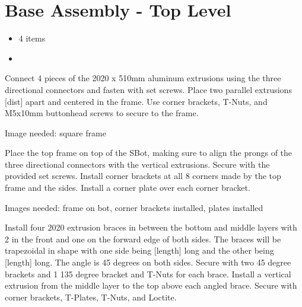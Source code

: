 \section{Base Assembly - Top Level}
\resetassemblysteps

\begin{partsbox}
\begin{minipage}[t]{\linewidth}
\vspace{0pt}
\begin{itemize}

\item
  4 items
\item
    
\end{itemize}
\end{minipage}
\end{partsbox}

Connect 4 pieces of the 2020 x 510mm aluminum extrusions using the three directional connectors and fasten with set screws. Place two parallel extrusions [dist] apart and centered in the frame. Use corner brackets, T-Nuts, and M5x10mm buttonhead screws to secure to the frame.

\begin{tipbox}
    Image needed: square frame
\end{tipbox}

Place the top frame on top of the SBot, making sure to align the prongs of the three directional connectors with the vertical extrusions. Secure with the provided set screws. Install corner brackets at all 8 corners made by the top frame and the sides. Install a corner plate over each corner bracket.

\begin{tipbox}
    Images needed: frame on bot, corner brackets installed, plates installed
\end{tipbox}

Install four 2020 extrusion braces in between the bottom and middle layers  with 2 in the front and one on the forward edge of both sides. The braces will be trapezoidal in shape with one side being [length] long and the other being [length] long. The angle is 45 degrees on both sides. Secure with two 45 degree brackets and 1 135 degree bracket and T-Nuts for each brace. Install a vertical extrusion from the middle layer to the top above each angled brace. Secure with corner brackets, T-Plates, T-Nuts, and Loctite.


